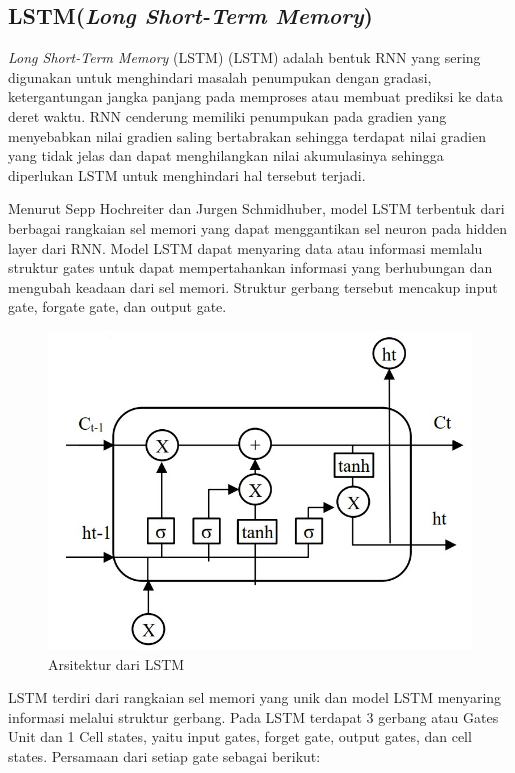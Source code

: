 \subsection{LSTM(\emph{Long Short-Term Memory})}
\emph{Long Short-Term Memory} (LSTM) (LSTM) adalah bentuk RNN yang sering digunakan untuk menghindari masalah penumpukan dengan gradasi, ketergantungan jangka panjang pada memproses atau membuat prediksi ke data deret waktu. RNN cenderung memiliki penumpukan pada gradien yang menyebabkan nilai gradien saling bertabrakan sehingga terdapat nilai gradien yang tidak jelas dan dapat menghilangkan nilai akumulasinya sehingga diperlukan LSTM untuk menghindari hal tersebut terjadi\cite{Cholissodin2019}.

Menurut Sepp Hochreiter dan Jurgen Schmidhuber, model LSTM terbentuk dari berbagai rangkaian sel memori yang dapat menggantikan sel neuron pada hidden layer dari RNN. Model LSTM dapat menyaring data atau informasi memlalu struktur gates untuk dapat mempertahankan informasi yang berhubungan dan mengubah keadaan dari sel memori. Struktur gerbang tersebut mencakup input gate, forgate gate, dan output gate\cite{Larasati2021}. 
\begin{figure} [H] \centering
  \includegraphics[scale=0.55]{gambar/LSTM.jpg}
  \caption{Arsitektur dari LSTM }
  \label{fig:Arsitektur LSTM }
\end{figure}
LSTM terdiri dari rangkaian sel memori yang unik dan model LSTM menyaring informasi
melalui struktur gerbang. Pada LSTM terdapat 3 gerbang atau Gates Unit dan 1 Cell states, yaitu input gates, forget gate, output gates, dan cell states. Persamaan dari setiap gate sebagai berikut:
